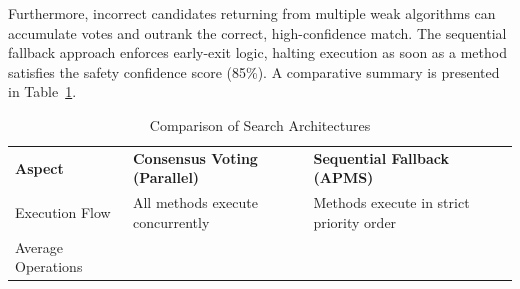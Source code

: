 \documentclass[12pt,a4paper,oneside]{report}
\begin{document}
Furthermore, incorrect candidates returning from multiple weak
algorithms can accumulate votes and outrank the correct, high-confidence
match. The sequential fallback approach enforces early-exit logic,
halting execution as soon as a method satisfies the safety confidence
score (85\%). A comparative summary is presented in Table~\ref{tab:table6}.

\begin{longtable}[]{@{}
  >{\raggedright\arraybackslash}p{}
  >{\raggedright\arraybackslash}p{}
  >{\raggedright\arraybackslash}p{}@{}}
\caption{Comparison of Search Architectures\label{tab:table6}}\\

\toprule\noalign{}
\begin{minipage}[b]{\linewidth}\raggedright

\textbf{Aspect}

\end{minipage} & \begin{minipage}[b]{\linewidth}\raggedright

\textbf{Consensus Voting (Parallel)}

\end{minipage} & \begin{minipage}[b]{\linewidth}\raggedright

\textbf{Sequential Fallback (APMS)}

\end{minipage} \\
\begin{minipage}[b]{\linewidth}\raggedright

Execution Flow

\end{minipage} & \begin{minipage}[b]{\linewidth}\raggedright

All methods execute concurrently

\end{minipage} & \begin{minipage}[b]{\linewidth}\raggedright

Methods execute in strict priority order

\end{minipage} \\
\begin{minipage}[b]{\linewidth}\raggedright

Average Operations


\end{minipage}
\end{longtable}
\end{document}

